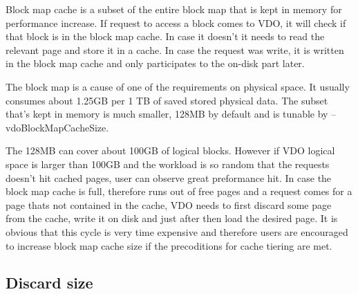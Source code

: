 \documentclass[
  color, %
  table, %
  lof,   %
  lot,   %
]{fithesis3}
\begin{document}
Block map cache is a subset of the entire block map that is kept in memory for performance increase. If request to access a block comes to VDO, it will check if that block is in the block map cache. In case it doesn't it needs to read the relevant page and store it in a cache. In case the request was write, it is written in the block map cache and only participates to the on-disk part later.

The block map is a cause of one of the requirements on physical space. It usually consumes about 1.25GB per 1 TB of saved stored physical data. The subset that's kept in memory is much smaller, 128MB by default and is tunable by --vdoBlockMapCacheSize.

The 128MB can cover about 100GB of logical blocks. However if VDO logical space is larger than 100GB and the workload is so random that the requests doesn't hit cached pages, user can observe great preformance hit. In case the block map cache is full, therefore runs out of free pages and a request comes for a page thats not contained in the cache, VDO needs to first discard some page from the cache, write it on disk and just after then load the desired page. It is obvious that this cycle is very time expensive and therefore users are encouraged to increase block map cache size if the precoditions for cache tiering are met.

\subsection{Discard size}





\end{document}
